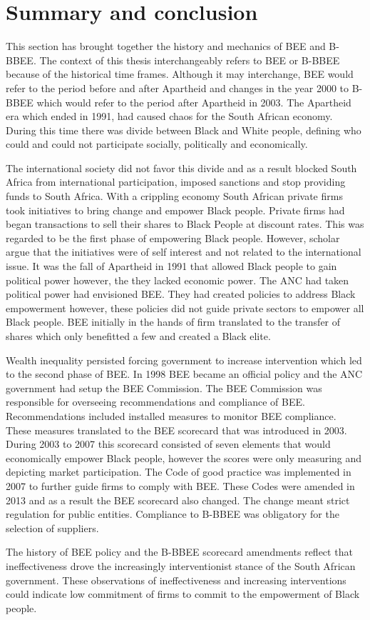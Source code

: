 \section{Summary and conclusion}
This section has brought together the history and mechanics of BEE and B-BBEE. The context of this thesis interchangeably refers to BEE or B-BBEE because of the historical time frames. Although it may interchange, BEE would refer to the period before and after Apartheid and changes in the year 2000 to  B-BBEE which would refer to the period after Apartheid in 2003. The Apartheid era which ended in 1991, had caused chaos for the South African economy. During this time there was divide between Black and White people, defining who could and could not participate socially, politically and economically.

The international society did not favor this divide and as a result blocked South Africa from international participation, imposed sanctions and stop providing funds to South Africa. With a crippling economy South African private firms took initiatives to bring change and empower Black people. Private firms had began transactions to sell their shares to Black People at discount rates. This was regarded to be the first phase of empowering Black people. However, scholar argue that the initiatives were of self interest and not related to the international issue. It was the fall of Apartheid in 1991 that allowed Black people to gain political power however, the they lacked economic power. The ANC had taken political power had envisioned BEE. They had created policies to address Black empowerment however, these policies did not guide private sectors to empower all Black people. BEE initially in the hands of firm translated to the transfer of shares which only benefitted a few and created a Black elite.

Wealth inequality persisted forcing government to increase intervention which led to the second phase of BEE. In 1998 BEE became an official policy and the ANC government had setup the BEE Commission. The BEE Commission was responsible for overseeing recommendations and compliance of BEE. Recommendations included installed measures to monitor BEE compliance. These measures translated to the BEE scorecard that was introduced in 2003. During 2003 to 2007 this scorecard consisted of seven elements that would economically empower Black people, however the scores were only measuring and depicting market participation. The Code of good practice was implemented in 2007 to further guide firms to comply with BEE. These Codes were amended in 2013 and as a result the BEE scorecard also changed. The change meant strict regulation for public entities. Compliance to B-BBEE was obligatory for the selection of suppliers.

The history of BEE policy and the B-BBEE scorecard amendments reflect that ineffectiveness drove the increasingly interventionist stance of the South African government. These observations of ineffectiveness and increasing interventions could indicate low commitment of firms to commit to the empowerment of Black people.